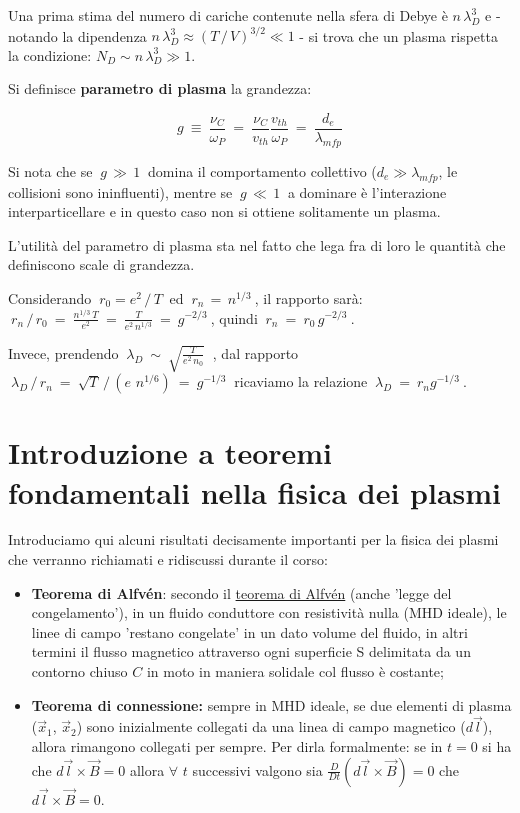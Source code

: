 Una prima stima del numero di cariche contenute nella sfera di Debye è $n\, \lambda_D^3$ e - notando la dipendenza $n\, \lambda_D^3 \approx (T\, /\, V)^{3/2}\ll 1$ - si trova che un plasma rispetta la condizione: $\boxed{N_D\sim n \, \lambda_D^3\gg 1}$.

Si definisce \textbf{parametro di plasma} la grandezza:

\[ \boxed{ \ g\ \equiv\ \frac{\nu_C}{\omega_P}\ =\ \frac{\nu_C}{v_{th}} \frac{v_{th}}{\omega_P} \ =\ \frac{d_e}{\lambda_{mfp}} \ } \]

Si nota che se $\ g\,\gg\, 1\ $ domina il comportamento collettivo ($d_e\gg\lambda_{mfp}$, le collisioni sono ininfluenti), mentre se $\ g\,\ll\, 1\ $ a dominare è l'interazione interparticellare e in questo caso non si ottiene solitamente un plasma.

L'utilità del parametro di plasma sta nel fatto che lega fra di loro le quantità che definiscono scale di grandezza.

Considerando $\ r_0 = e^2\, /\, T\ $ ed $\ r_n\, =\, n^{1/3}\ $, il rapporto sarà:
$\ r_n\,/\,r_0\ =\ \displaystyle\frac{n^{1/3}\,T}{e^2}\ =\ \frac{T}{e^2\, n^{1/3}}\ =\ g^{-2/3}\ $, quindi $\ r_n\ =\ r_0 \,g^{-2/3}\ $.

Invece, prendendo $\ \lambda_D\ \sim\ \sqrt{\displaystyle\frac{T}{e^2 \, n_0}}\ $ , dal rapporto $\ \lambda_D\, /\, r_n\ =\ \sqrt{T}\, /\, (e\, \,n^{1/6})\ =\ g^{-1/3}\ $ ricaviamo la relazione $\ \lambda_D\ =\ r_n g^{-1/3}\ $.



%
%
\vspace{0.5cm}
\section{Introduzione a teoremi fondamentali nella fisica dei plasmi} 

Introduciamo qui alcuni risultati decisamente importanti per la fisica dei plasmi che verranno richiamati e ridiscussi durante il corso:

\begin{itemize}
	\item \textbf{Teorema di Alfvén}: secondo il \href{https://it.wikipedia.org/wiki/Teorema_di_Alfv%C3%A9n}{teorema di Alfvén} (anche 'legge del congelamento'), in un fluido conduttore con resistività nulla (MHD ideale), le linee di campo 'restano congelate' in un dato volume del fluido, in altri termini il flusso magnetico attraverso ogni superficie S delimitata da un contorno chiuso $C$ in moto in maniera solidale col flusso è costante;
	\item \textbf{Teorema di connessione:} sempre in MHD ideale, se due elementi di plasma ($\vec x_1$, $\vec x_2$) sono inizialmente collegati da una linea di campo magnetico ($d\vec l$), allora rimangono collegati per sempre. Per dirla formalmente: se in $t=0$ si ha che $d\vec l\times \vec B=0$ allora $\forall \, \, t$ successivi valgono sia $\frac{D}{Dt}(d\vec l\times \vec B)=0$ che $d\vec l\times \vec B=0$.
\end{itemize}

